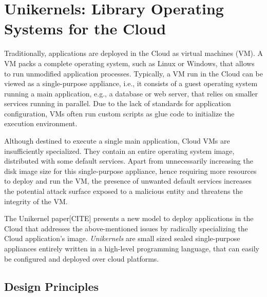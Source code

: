 \section{Unikernels: Library Operating Systems for the Cloud}

Traditionally, applications are deployed in the Cloud as virtual machines (VM).
A VM packs a complete operating system, such as Linux or Windows, that allows to run unmodified application processes.
Typically, a VM run in the Cloud can be viewed as a single-purpose appliance, i.e., it consists of a guest operating system running a main application, e.g., a database or web server, that relies on smaller services running in parallel.
Due to the lack of standards for application configuration, VMs often run custom scripts as glue code to initialize the execution environment.

Although destined to execute a single main application, Cloud VMs are insufficiently specialized.
They contain an entire operating system image, distributed with some default services.
Apart from unnecessarily increasing the disk image size for this single-purpose appliance, hence requiring more resources to deploy and run the VM, the presence of unwanted default services increases the potential attack surface exposed to a malicious entity and threatens the integrity of the VM.

The Unikernel paper[CITE] presents a new model to deploy applications in the Cloud that addresses the above-mentioned issues by radically specializing the Cloud application's image.
\emph{Unikernels} are small sized sealed single-purpose appliances entirely written in a high-level programming language, that can easily be configured and deployed over cloud platforms.


\subsection{Design Principles}



